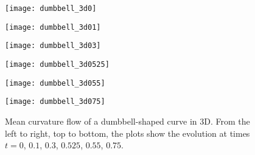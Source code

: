 \begin{figure}[htb!]
        \centering
\begin{minipage}{0.48\textwidth}
        \texttt{[image: dumbbell\_3d0]}
\end{minipage}%
\begin{minipage}{0.48\textwidth}
        \texttt{[image: dumbbell\_3d01]}
\end{minipage}
\begin{minipage}{0.48\textwidth}
        \texttt{[image: dumbbell\_3d03]}
\end{minipage}%
\begin{minipage}{0.48\textwidth}
        \texttt{[image: dumbbell\_3d0525]}
\end{minipage}
\begin{minipage}{0.48\textwidth}
        \texttt{[image: dumbbell\_3d055]}
\end{minipage}%
\begin{minipage}{0.48\textwidth}
        \texttt{[image: dumbbell\_3d075]}
\end{minipage}
\caption[Mean curvature flow of a dumbbell-shaped curve in 3D.]{Mean curvature flow of a dumbbell-shaped curve in 3D. From the left to right, top to bottom, the plots show the evolution at times $t=0$, $0.1$, $0.3$, $0.525$, $0.55$, $0.75$.}
\label{fig:mcm 3d dumbbell}
\end{figure}


